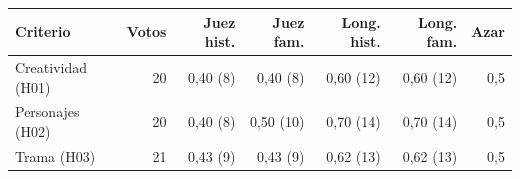 \begin{tabular}{@{}lrrrrrr@{}}
\toprule
Criterio & Votos & Juez hist. & Juez fam. & Long. hist. & Long. fam. & Azar \\
\midrule
Creatividad (H01) & 20 & 0,40 (8) & 0,40 (8) & 0,60 (12) & 0,60 (12) & 0,5 \\
Personajes (H02) & 20 & 0,40 (8) & 0,50 (10) & 0,70 (14) & 0,70 (14) & 0,5 \\
Trama (H03) & 21 & 0,43 (9) & 0,43 (9) & 0,62 (13) & 0,62 (13) & 0,5 \\
\bottomrule
\end{tabular}
